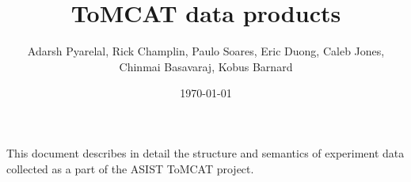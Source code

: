 \documentclass[11pt,letterpaper,oneside,openany,article]{memoir}
\title{ToMCAT data products}
\author{Adarsh Pyarelal, Rick Champlin, Paulo Soares, Eric Duong, Caleb
Jones, Chinmai Basavaraj, Kobus Barnard}
\date{\today}
\begin{document}
\maketitle
\setcounter{page}{2}


This document describes in detail the structure and semantics of experiment data
collected as a part of the ASIST ToMCAT project.






\end{document}
